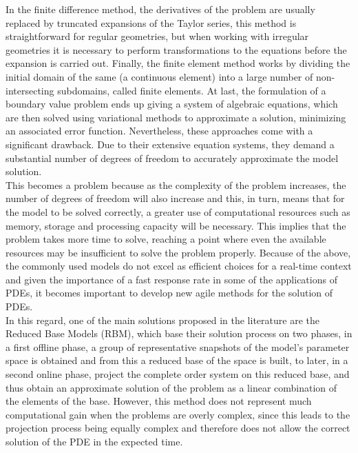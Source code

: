 \documentclass[12pt,letterpaper]{article}
\begin{document}
In the finite difference method, the derivatives of the problem are usually replaced by truncated expansions of the Taylor series, this method is straightforward for regular geometries, but when working with irregular geometries it is necessary to perform transformations to the equations before the expansion is carried out\cite{AutoDesk}. Finally, the finite element method works by dividing the initial domain of the same (a continuous element) into a large number of non-intersecting subdomains, called finite elements. At last, the formulation of a boundary value problem ends up giving a system of algebraic equations, which are then solved using variational methods to approximate a solution, minimizing an associated error function\cite{element}. Nevertheless, these approaches come with a significant drawback. Due to their extensive equation systems, they demand a substantial number of degrees of freedom to accurately approximate the model solution. \\


This becomes a problem because as the complexity of the problem increases, the number of degrees of freedom will also increase and this, in turn, means that for the model to be solved correctly, a greater use of computational resources such as memory, storage and processing capacity will be necessary. This implies that the problem takes more time to solve, reaching a point where even the available resources may be insufficient to solve the problem properly. Because of the above, the commonly used models do not excel as efficient choices for a real-time context and given the importance of a fast response rate in some of the applications of PDEs\cite{raissi2019physics}, it becomes important to develop new agile methods for the solution of PDEs.\\

In this regard, one of the main solutions proposed in the literature are the Reduced Base Models (RBM), which base their solution process on two phases, in a first offline phase, a group of representative snapshots  of the model's parameter space is obtained and from this a reduced base of the space is built, to later, in a second online phase, project the complete order system on this reduced base, and thus obtain an approximate solution of the problem as a linear combination of the elements of the base. However, this method does not represent much computational gain when the problems are overly complex, since this leads to the projection process being equally complex and therefore does not allow the correct solution of the PDE in the expected time.
\end{document}
